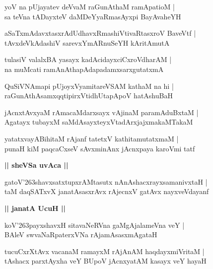 \documentclass[twoside,12pt,openright]{book}
\def\S{\char'263}
\newcounter{shloka}[chapter]
\def\uvaca#1{\centerline{{\large\textbf{#1}}}}
\begin{document}
\begin{shloka}%
yoV na pUjayatev deVvaM raGunAthaM ramApatioM |\\
sa teVna tADayxteV daMDeYyaRmasAyxpi BayAvaheYH 
\end{shloka}

\begin{shloka}%
aSaTxmAdavxtasxrAdUdhavxRmashiVtivaRtasxroV BaveVtf |\\
tAvxdeVkAdashiV sarevxYmARnuSeYH kAritAmutA 
\end{shloka}

\begin{shloka}%
tulasiV valalxBA yasayx kadAcidayxciCxroVdharAM |\\
na muMcati ramAnAthapAdapadamxsarxgutatxmA 
\end{shloka}

\begin{shloka}%
QuSiVNAmapi pUjoyxVyamitareVSAM kathaM na hi |\\
raGunAthAsamxqqtipirxVtidhUtapApoV hatAshuBaH 
\end{shloka}

\begin{shloka}%
jAcnxtAvxyaM rAmacaMdarxsayx vAjinaM paramAduBxtaM |\\
Agatayx tubayxM saMdAsayxteyxVtadArxjajxmakaMTakaM 
\end{shloka}

\begin{shloka}%
yatatxvayABihitaM rAjanf tatetxV kathitamutatxmaM |\\
punaH kiM paqcaCxseV sAvxminAnx jAcnxpaya karoVmi tatf 
\end{shloka}

\uvaca{|| sheVSa uvAca ||}

\begin{shloka}%
gatoV\S shavxsatxtupxrAMtasutx nAnAshacxrayxsamanivxtaH |\\
taM daqSATxvX janatAsasxrAvx rAjecnxV gatAvx nayxveVdayanf 
\end{shloka}

\uvaca{|| janatA UcuH ||}

\begin{shloka}%
koV\S payxshavxH sitavaNeRVna gaMgAjalameVna veY |\\
BAleV swvaNaRpaterxVNa rAjamAsasxmAgataH 
\end{shloka}

\begin{shloka}%
tucuCxrXtAvx vacanaM ramayxM rAjAnAM haqdayxmiVritaM |\\
tAshacx parxtAyxha veY BUpoV jAcnxyatAM kasayx veY hayaH
\end{shloka}
\end{document}

